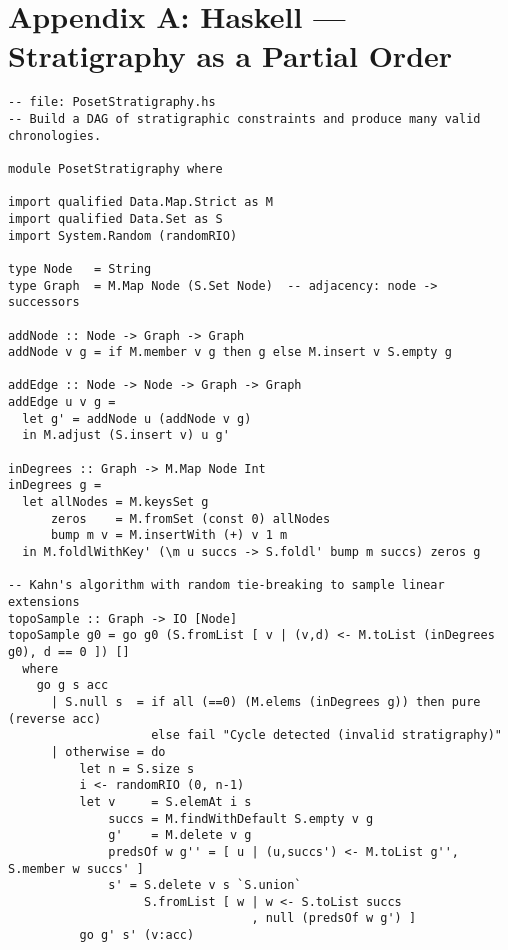 \documentclass[11pt]{article}
\theoremstyle{definition}
\theoremstyle{plain}
\theoremstyle{remark}
\begin{document}
\appendix
\section*{Appendix A: Haskell — Stratigraphy as a Partial Order}
\begin{lstlisting}
-- file: PosetStratigraphy.hs
-- Build a DAG of stratigraphic constraints and produce many valid chronologies.

module PosetStratigraphy where

import qualified Data.Map.Strict as M
import qualified Data.Set as S
import System.Random (randomRIO)

type Node   = String
type Graph  = M.Map Node (S.Set Node)  -- adjacency: node -> successors

addNode :: Node -> Graph -> Graph
addNode v g = if M.member v g then g else M.insert v S.empty g

addEdge :: Node -> Node -> Graph -> Graph
addEdge u v g =
  let g' = addNode u (addNode v g)
  in M.adjust (S.insert v) u g'

inDegrees :: Graph -> M.Map Node Int
inDegrees g =
  let allNodes = M.keysSet g
      zeros    = M.fromSet (const 0) allNodes
      bump m v = M.insertWith (+) v 1 m
  in M.foldlWithKey' (\m u succs -> S.foldl' bump m succs) zeros g

-- Kahn's algorithm with random tie-breaking to sample linear extensions
topoSample :: Graph -> IO [Node]
topoSample g0 = go g0 (S.fromList [ v | (v,d) <- M.toList (inDegrees g0), d == 0 ]) []
  where
    go g s acc
      | S.null s  = if all (==0) (M.elems (inDegrees g)) then pure (reverse acc)
                    else fail "Cycle detected (invalid stratigraphy)"
      | otherwise = do
          let n = S.size s
          i <- randomRIO (0, n-1)
          let v     = S.elemAt i s
              succs = M.findWithDefault S.empty v g
              g'    = M.delete v g
              predsOf w g'' = [ u | (u,succs') <- M.toList g'', S.member w succs' ]
              s' = S.delete v s `S.union`
                   S.fromList [ w | w <- S.toList succs
                                  , null (predsOf w g') ]
          go g' s' (v:acc)
\end{lstlisting}
\end{document}
